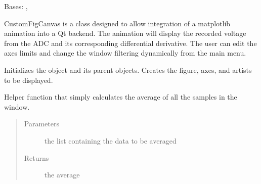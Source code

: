\documentclass[letterpaper,10pt,english]{sphinxmanual}
\begin{document}
\begin{fulllineitems}
\label{\detokenize{animation:animation.CustomFigCanvas}}
Bases: , 

CustomFigCanvas is a class designed to allow integration of a matplotlib animation into a Qt backend.
The animation will display the recorded voltage from the ADC and its corresponding differential derivative.
The user can edit the axes limits and change the window filtering dynamically from the main menu.

\begin{fulllineitems}
\label{\detokenize{animation:animation.CustomFigCanvas.__init__}}
Initializes the object and its parent objects. Creates the figure, axes, and artists to be displayed.

\end{fulllineitems}


\begin{fulllineitems}
\label{\detokenize{animation:animation.CustomFigCanvas.get_windowed_value}}
Helper function that simply calculates the average of all the samples in the window.
\begin{quote}\begin{description}
\item[{Parameters}] \leavevmode
{} \textendash{} the list containing the data to be averaged

\item[{Returns}] \leavevmode
the average

\end{description}\end{quote}

\end{fulllineitems}


\end{fulllineitems}
\end{document}
